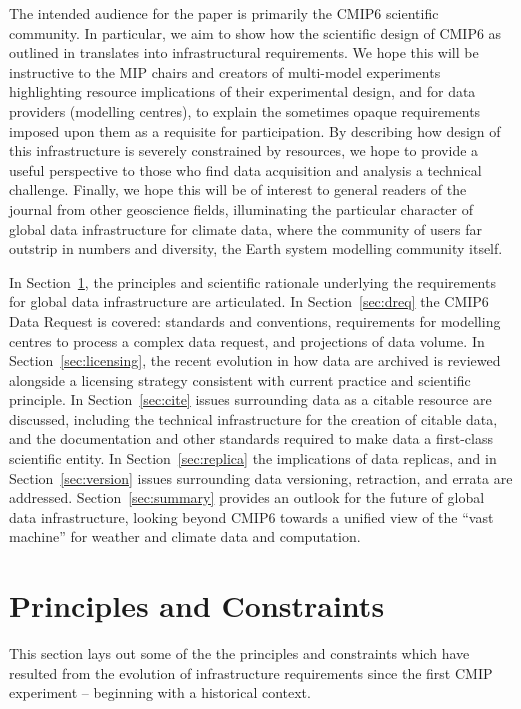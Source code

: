 \documentclass[gmd,manuscript]{copernicus}
\begin{document}
The intended audience for the paper is primarily the CMIP6 scientific
community. In particular, we aim to show how the scientific design of
CMIP6 as outlined in \cite{ref:eyringetal2016a} translates into
infrastructural requirements. We hope this will be instructive to the
MIP chairs and creators of multi-model experiments highlighting
resource implications of their experimental design, and for data
providers (modelling centres), to explain the sometimes opaque
requirements imposed upon them as a requisite for participation. By
describing how design of this infrastructure is severely constrained
by resources, we hope to provide a useful perspective to those who
find data acquisition and analysis a technical challenge. Finally, we
hope this will be of interest to general readers of the journal from
other geoscience fields, illuminating the particular character of
global data infrastructure for climate data, where the community of
users far outstrip in numbers and diversity, the Earth system
modelling community itself.

In Section~\ref{sec:principles}, the principles and scientific
rationale underlying the requirements for global data infrastructure
are articulated. In Section~\ref{sec:dreq} the CMIP6 Data Request is
covered: standards and conventions, requirements for modelling centres
to process a complex data request, and projections of data volume. In
Section~\ref{sec:licensing}, the recent evolution in how data are
archived is reviewed alongside a licensing strategy consistent with
current practice and scientific principle. In Section~\ref{sec:cite}
issues surrounding data as a citable resource are discussed, including
the technical infrastructure for the creation of citable data, and the
documentation and other standards required to make data a first-class
scientific entity. In Section~\ref{sec:replica} the implications of
data replicas, and in Section~\ref{sec:version} issues surrounding
data versioning, retraction, and errata are addressed.
Section~\ref{sec:summary} provides an outlook for the future of global
data infrastructure, looking beyond CMIP6 towards a unified view of
the ``vast machine'' for weather and climate data and computation.


\section{Principles and Constraints}
\label{sec:principles}

This section lays out some of the the principles and constraints which
have resulted from the evolution of infrastructure requirements since
the first CMIP experiment -- beginning with a historical context.
\end{document}
